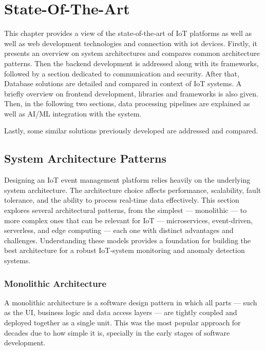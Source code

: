 
%

\chapter{State-Of-The-Art}
\label{cha:State-Of-The-Art}

This chapter provides a view of the state-of-the-art of \gls{IoT} platforms as well
as well as web development technologies and connection with iot devices.
Firstly, it presents an overview on system architectures and compares common
architecture patterns. Then the backend development is addressed along with
its frameworks, followed by a section dedicated to communication and security.
After that, Database solutions are detailed and compared in context of IoT
systems. A briefly overview on frontend development, libraries and frameworks is
also given.
Then, in the following two sections, data processing pipelines are explained as
well as \gls{AI}/\gls{ML} integration with the system.

Lastly, some similar solutions previously developed are addressed and compared.

\section{System Architecture Patterns}
Designing an IoT event management platform relies heavily on the underlying
system architecture. The architecture choice affects performance, scalability,
fault tolerance, and the ability to process real-time data effectively. This
section explores several architectural patterns, from the simplest --- monolithic
--- to more complex ones that can be relevant for IoT --- microservices,
event-driven, serverless, and edge computing --- each one with distinct
advantages and challenges. Understanding these models provides a foundation for
building the best architecture for a robust IoT-system monitoring and anomaly
detection systems.

\subsection{Monolithic Architecture}
A monolithic architecture is a software design pattern in which all parts ---
such as the \gls{UI}, business logic and data access layers --- are tightly
coupled and deployed together as a single unit\cite{7436659,10031648}. This
was the most popular approach for decades due to how simple it is, specially in
the early stages of software development\cite{Garlan2018}.

